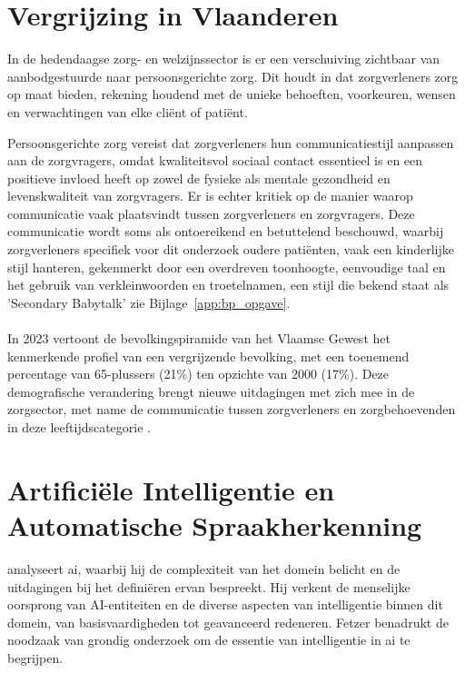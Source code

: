 \section{Vergrijzing in Vlaanderen}


In de hedendaagse zorg- en welzijnssector is er een verschuiving zichtbaar van aanbodgestuurde naar persoonsgerichte zorg. Dit houdt in dat zorgverleners zorg op maat bieden, rekening houdend met de unieke behoeften, voorkeuren, wensen en verwachtingen van elke cliënt of patiënt. 

Persoonsgerichte zorg vereist dat zorgverleners hun communicatiestijl aanpassen aan de zorgvragers, omdat kwaliteitsvol sociaal contact essentieel is en een positieve invloed heeft op zowel de fysieke als mentale gezondheid en levenskwaliteit van zorgvragers.
Er is echter kritiek op de manier waarop communicatie vaak plaatsvindt tussen zorgverleners en zorgvragers. Deze communicatie wordt soms als ontoereikend en betuttelend beschouwd, waarbij zorgverleners specifiek voor dit onderzoek oudere patiënten, vaak een kinderlijke stijl hanteren, gekenmerkt door een overdreven toonhoogte, eenvoudige taal en het gebruik van verkleinwoorden en troetelnamen, een stijl die bekend staat als 'Secondary Babytalk' zie Bijlage~\ref{app:bp_opgave}.
\\
\\
In 2023 vertoont de bevolkingspiramide van het Vlaamse Gewest het kenmerkende profiel van een vergrijzende bevolking, met een toenemend percentage van 65-plussers (21\%) ten opzichte van 2000 (17\%). Deze demografische verandering brengt nieuwe uitdagingen met zich mee in de zorgsector, met name de communicatie tussen zorgverleners en zorgbehoevenden in deze leeftijdscategorie \autocite{Vlaanderen.be}. 
 
\section{Artificiële Intelligentie en Automatische Spraakherkenning}

\textcite{Fetzer_1990} analyseert \gls{ai}, waarbij hij de complexiteit van het domein belicht en de uitdagingen bij het definiëren ervan bespreekt. Hij verkent de menselijke oorsprong van AI-entiteiten en de diverse aspecten van intelligentie binnen dit domein, van basisvaardigheden tot geavanceerd redeneren. Fetzer benadrukt de noodzaak van grondig onderzoek om de essentie van intelligentie in \gls{ai} te begrijpen.

